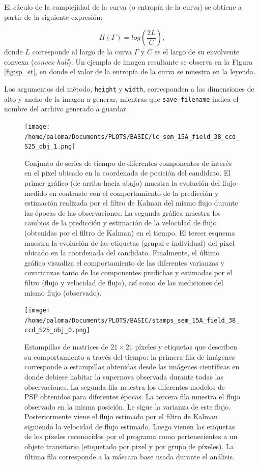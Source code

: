 \begin{itemize}
El c\'aculo de la complejidad de la curva (o entrop\'ia de la curva) se obtiene a partir de la siguiente expresi\'on:

\begin{equation}
H(\Gamma) = log\left( \dfrac{2L}{C} \right), 
\label{eq:entropy_curve}
\end{equation}
donde $L$ corresponde al largo de la curva $\Gamma$ y $C$ es el largo de su envolvente convexa (\textit{convex hull})\cite{balestrino}.  Un ejemplo de imagen resultante se observa en la Figura \ref{fig:sp_st}, en donde el valor de la entrop\'ia de la curva se muestra en la leyenda.

Los argumentos del m\'etodo, \texttt{height} y \texttt{width}, corresponden a las dimensiones de alto y ancho de la imagen a generar, mientras que \texttt{save\_filename} indica el nombre del archivo generado a guardar.  
\end{itemize}

\begin{figure}[h!]
\centering
\texttt{[image: /home/paloma/Documents/PLOTS/BASIC/lc\_sem\_15A\_field\_38\_ccd\_S25\_obj\_1.png]}
\caption{Conjunto de series de tiempo de diferentes componentes de inter\'es en el pixel ubicado en la coordenada de posici\'on del candidato. El primer gr\'afico (de arriba hacia abajo) muestra la evoluci\'on del flujo medido en contraste con el comportamiento de la predicci\'on y estimaci\'on realizada por el filtro de Kalman del mismo flujo durante las \'epocas de las observaciones. La segunda gr\'afica muestra los cambios de la predicci\'on y estimaci\'on de la velocidad de flujo (obtenidas por el filtro de Kalman) en el tiempo. El tercer esquema muestra la evoluci\'on de las etiquetas (grupal e individual) del pixel ubicado en la coordenada del candidato. Finalmente, el \'ultimo gr\'afico visualiza el comportamiento de las diferentes varianzas y covarianzas tanto de las componentes predichas y estimadas por el filtro (flujo y velocidad de flujo), as\'i como de las mediciones del mismo flujo (observado).}
\label{fig:lc_result}
\end{figure}

\begin{figure}[h!]
\centering
\texttt{[image: /home/paloma/Documents/PLOTS/BASIC/stamps\_sem\_15A\_field\_38\_ccd\_S25\_obj\_0.png]}
\caption{Estampillas de matrices de $21 \times 21$ p\'ixeles y etiquetas que describen su comportamiento a trav\'es del tiempo: la primera fila de im\'agenes corresponde a estampillas obtenidas desde las im\'agenes cient\'ificas en donde debiese habitar la supernova observada durante todas las observaciones. La segunda fila muestra los diferentes modelos de PSF obtenidos para diferentes \'epocas. La tercera fila muestra el flujo observado en la misma posici\'on. Le sigue la varianza de este flujo. Posteriormente viene el flujo estimado por el filtro de Kalman siguiendo la velocidad de flujo estimado. Luego vienen las etiquetas de los p\'ixeles reconocidos por el programa como pertenecientes a un objeto transitorio (etiquetado por pixel y por grupo de p\'ixeles). La \'ultima fila corresponde a la m\'ascara base usada durante el an\'alisis.}
\label{fig:stamps_result}
\end{figure}
\bigskip


